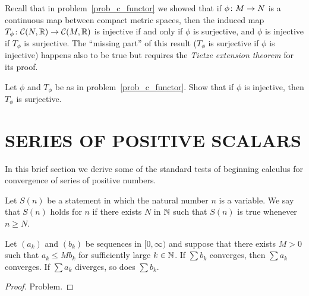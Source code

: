 Recall that in problem~\ref{prob_c_functor} we showed that if $\phi\colon M \rightarrow N$ is a
continuous map between compact metric spaces, then the induced map $T_{\phi}\colon \mathcal{C}(N,\mathbb{R}) \rightarrow \mathcal{C}(M,\mathbb{R})$ is injective if and only if $\phi$ is surjective, and $\phi$ is
injective if $T_{\phi}$ is surjective.  The ``missing part'' of this result ($T_{\phi}$ is
surjective if $\phi$ is injective) happens also to be true but requires the \emph{Tietze
extension theorem} for its proof.

\begin{prob} Let $\phi$ and $T_{\phi}$ be as in problem~\ref{prob_c_functor}.  Show that if
$\phi$ is injective, then $T_{\phi}$ is surjective.
\end{prob}











\section{SERIES OF POSITIVE SCALARS}
In this brief section we derive some of the standard tests of beginning calculus for
convergence of series of positive numbers.

\begin{defn}  Let $S(n)$ be a statement in which the natural number $n$ is a variable.  We say
that $S(n)$ holds for $n$
 if there exists $N$ in $\mathbb{N}$ such that $S(n)$ is true whenever $n \ge
N$.
\end{defn}

\begin{prop}\label{comp_test}
Let $(a_k)$ and $(b_k)$ be sequences in $[0, \infty)$ and suppose that there exists $M > 0$
such that $a_k \le Mb_k$ for sufficiently large $k \in \mathbb{N}$.  If $\sum b_k$ converges, then
$\sum a_k$ converges.  If $\sum a_k$ diverges, so does $\sum b_k$.
\end{prop}

\begin{proof} Problem.    \ns  \end{proof}


